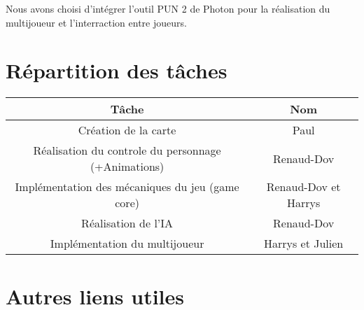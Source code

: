 \documentclass[french, 12pt, letterpaper, twoside]{article}
\begin{document}
Nous avons choisi d'intégrer l'outil PUN 2 de Photon pour la réalisation du multijoueur et l'interraction entre joueurs.

\newpage
\section{Répartition des tâches}
\begin{center}
    \begin{tabular}{|*{2}{c|}}
        \hline
        \textbf{Tâche} & \textbf{Nom} \tabularnewline
        \hline
        Création de la carte & Paul\tabularnewline
        \hline
        Réalisation du controle du personnage (+Animations) & Renaud-Dov\tabularnewline
        \hline
        Implémentation des mécaniques du jeu (game core) & Renaud-Dov et Harrys\tabularnewline
        \hline
        Réalisation de l'IA & Renaud-Dov \tabularnewline
        \hline
        Implémentation du multijoueur & Harrys et Julien \tabularnewline
        \hline
    \end{tabular}
\end{center}





\section{Autres liens utiles}
\end{document}
